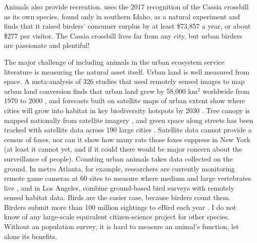 \documentclass[12pt]{article}
\begin{document}
Animals also provide recreation. \citet{wardleRecreationalValueRare2025} uses the 2017 recognition of the Cassia crossbill as its own species, found only in southern Idaho, as a natural experiment and finds that it raised birders' consumer surplus by at least \$73,857 a year, or about \$277 per visitor. The Cassia crossbill lives far from any city, but urban birders are passionate and plentiful!

The major challenge of including animals in the urban ecosystem service literature is measuring the natural asset itself. Urban land is well measured from space. A meta-analysis of 326 studies that used remotely sensed images to map urban land conversion finds that urban land grew by 58,000 km$^2$ worldwide from 1970 to 2000 \citep{setoMetaanalysisGlobalUrban2011}, and forecasts built on satellite maps of urban extent show where cities will grow into habitat in key biodiversity hotspots by 2030 \citep{setoGlobalForecastsUrban2012}. Tree canopy is mapped nationally from satellite imagery \citep{housmanNationalLandCover2023}, and green space along streets has been tracked with satellite data across 190 large cities \citep{falchettaTrackingGreenSpace2025}. Satellite data cannot provide a census of foxes, nor can it show how many rats those foxes suppress in New York (at least it cannot yet, and if it could there would be major concern about the surveillance of people). Counting urban animals takes data collected on the ground. In metro Atlanta, for example, researchers are currently monitoring remote game cameras at 60 sites to measure where medium and large vertebrates live \citep{kohlQuantifyingUrbanWildlife2024}, and in Los Angeles, \citet{woodHistoricalRacialRedlining2023} combine ground-based bird surveys with remotely sensed habitat data. Birds are the easier case, because birders count them. Birders submit more than 100 million sightings to eBird each year \citep{wardleRecreationalValueRare2025}. I do not know of any large-scale equivalent citizen-science project for other species. Without an population survey, it is hard to measure an animal's function, let alone its benefits.
\end{document}
